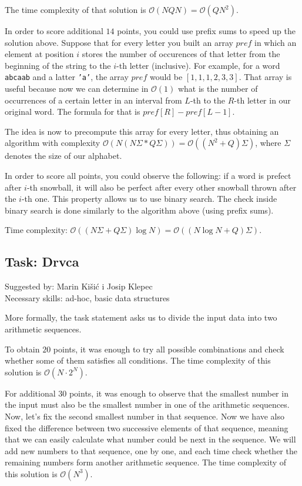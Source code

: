 \documentclass[a4paper]{article}
\begin{document}
The time complexity of that solution is $\mathcal{O}(NQN)=\mathcal{O}(QN^2)$.

In order to score additional $14$ points, you could use prefix sums to speed
up the solution above. Suppose that for every letter you built an array $pref$
in which an element at position $i$ stores the number of occurences of that
letter from the beginning of the string to the $i$-th letter (inclusive). For
example, for a word \texttt{abcaab} and a latter \texttt{'a'}, the array $pref$
would be $[1, 1, 1, 2, 3, 3]$. That array is useful because now we can determine
in $\mathcal{O}(1)$ what is the number of occurrences of a certain letter in
an interval from $L$-th to the $R$-th letter in our original word. The formula
for that is $pref[R]-pref[L-1]$.

The idea is now to precompute this array for every letter, thus obtaining an
algorithm with complexity $\mathcal{O}(N(N\Sigma * Q\Sigma))=
\mathcal{O}((N^2 + Q)\Sigma)$, where $\Sigma$ denotes the size of our
alphabet.

In order to score all points, you could observe the following: if a word is
prefect after $i$-th snowball, it will also be perfect after every other snowball
thrown after the $i$-th one. This property allows us to use binary search. The
check inside binary search is done similarly to the algorithm above (using
prefix sums).

Time complexity: $\mathcal{O}((N\Sigma + Q\Sigma)\log N) = \mathcal{O}((N \log N + Q)\Sigma)$.


\subsection*{Task: Drvca}
\textsf{Suggested by: Marin Kišić i Josip Klepec}\\
\textsf{Necessary skills: ad-hoc, basic data structures}

More formally, the task statement asks us to divide the input data into
two arithmetic sequences.

To obtain $20$ points, it was enough to try all possible combinations and
check whether some of them satisfies all conditions. The time complexity
of this solution is $\mathcal{O}(N \cdot 2^N)$.

For additional $30$ points, it was enough to observe that the smallest
number in the input must also be the smallest number in one of the
arithmetic sequences. Now, let's fix the second smallest number in that
sequence. Now we have also fixed the difference between two successive
elements of that sequence, meaning that we can easily calculate what number
could be next in the sequence. We will add new numbers to that sequence,
one by one, and each time check whether the remaining numbers form another
arithmetic sequence. The time complexity of this solution is $\mathcal{O}(N^3)$.
\end{document}
